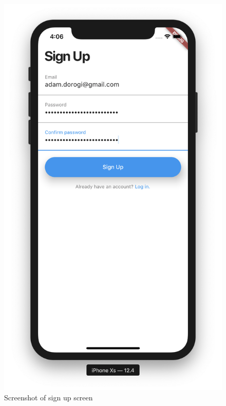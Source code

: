 \documentclass[12pt,openany,a4paper]{book}
\begin{document}
\begin{figure}[h]
\centering\includegraphics[width=\textwidth]{SignUpScreen.png}
\caption{Screenshot of sign up screen}
\label{fig:sign_up_screen}
\end{figure}
\end{document}

